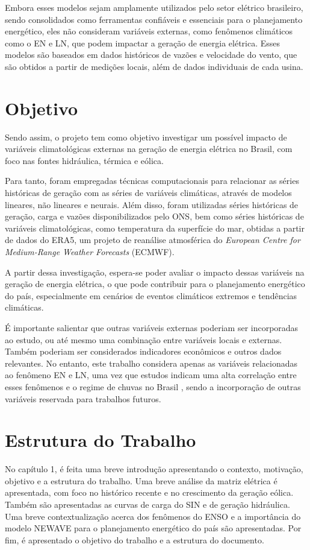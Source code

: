 Embora esses modelos sejam amplamente utilizados pelo setor elétrico brasileiro, sendo consolidados como ferramentas
confiáveis e essenciais para o planejamento energético, eles não consideram variáveis externas, como fenômenos climáticos
como o EN e LN, que podem impactar a geração de energia elétrica. Esses modelos são baseados em dados históricos de
vazões e velocidade do vento, que são obtidos a partir de medições locais, além de dados individuais de cada usina.

\section{Objetivo}
Sendo assim, o projeto tem como objetivo investigar um possível impacto de variáveis climatológicas externas na geração 
de energia elétrica no Brasil, com foco nas fontes hidráulica, térmica e eólica. 

Para tanto, foram empregadas técnicas computacionais para relacionar as séries históricas de geração com as séries de variáveis 
climáticas, através de modelos lineares, não lineares e neurais. Além disso, foram utilizadas séries históricas de geração, 
carga e vazões disponibilizados pelo ONS, bem como séries históricas de variáveis climatológicas, como temperatura 
da superfície do mar, obtidas a partir de dados do ERA5, um projeto de reanálise atmosférica do \textit{European Centre for Medium-Range Weather Forecasts} (ECMWF).

A partir dessa investigação, espera-se poder avaliar o impacto dessas variáveis na geração de energia elétrica,
o que pode contribuir para o planejamento energético do país, especialmente em cenários de eventos climáticos extremos e
tendências climáticas.

É importante salientar que outras variáveis externas poderiam ser incorporadas ao estudo, ou até mesmo uma combinação entre
 variáveis locais e externas. Também poderiam ser considerados indicadores econômicos e outros dados relevantes. 
No entanto, este trabalho considera apenas as variáveis relacionadas ao fenômeno EN e LN, uma vez que estudos indicam
uma alta correlação entre esses fenômenos e o regime de chuvas no Brasil \cite{de2012influencia, Andreoli2016}, sendo a 
incorporação de outras variáveis reservada para trabalhos futuros.

\section{Estrutura do Trabalho}
No capítulo 1, é feita uma breve introdução apresentando o contexto, motivação, objetivo e a estrutura do trabalho. Uma
breve análise da matriz elétrica é apresentada, com foco no histórico recente e no crescimento da geração eólica. Também
são apresentadas as curvas de carga do SIN e de geração hidráulica. Uma breve contextualização acerca dos fenômenos do
ENSO e a importância do modelo NEWAVE para o planejamento energético do país são apresentadas. Por fim, é apresentado
o objetivo do trabalho e a estrutura do documento.

